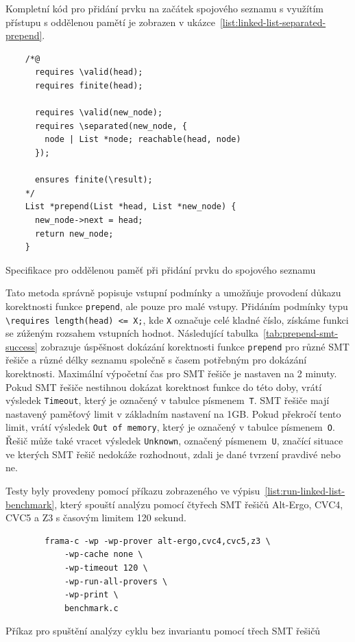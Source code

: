 Kompletní kód pro přidání prvku na začátek spojového seznamu
s využítím přístupu s oddělenou pamětí je zobrazen v ukázce~\ref{list:linked-list-separated-prepend}.

\begin{listing}[H]
    \begin{verbatim}
    /*@
      requires \valid(head);
      requires finite(head);

      requires \valid(new_node);
      requires \separated(new_node, {
        node | List *node; reachable(head, node)
      });

      ensures finite(\result);
    */
    List *prepend(List *head, List *new_node) {
      new_node->next = head;
      return new_node;
    }
    \end{verbatim}
    \caption{Specifikace pro oddělenou paměť při přidání prvku do spojového seznamu}
    \label{list:linked-list-separated-prepend}
\end{listing}

Tato metoda správně popisuje vstupní podmínky a umožňuje provodení důkazu korektnosti funkce \texttt{prepend},
ale pouze pro malé vstupy.
Přidáním podmínky typu \texttt{\textbackslash requires length(head) <= X;},
kde \texttt{X} označuje celé kladné číslo,
získáme funkci se zúženým rozsahem vstupních hodnot.
Následující tabulka~\ref{tab:prepend-smt-success} zobrazuje úspěšnost dokázání korektnosti funkce \texttt{prepend}
pro různé SMT řešiče a různé délky seznamu společně s časem potřebným pro dokázání korektnosti.
Maximální výpočetní čas pro SMT řešiče je nastaven na 2 minuty.
Pokud SMT řešiče nestihnou dokázat korektnost funkce do této doby,
vrátí výsledek \texttt{Timeout}, který je označený v tabulce písmenem~\texttt{T}.
SMT řešiče mají nastavený paměťový limit v základním nastavení na 1GB\@.
Pokud překročí tento limit, vrátí výsledek \texttt{Out of memory},
který je označený v tabulce písmenem~\texttt{O}.
Řešič může také vracet výsledek \texttt{Unknown}, označený písmenem~\texttt{U},
značící situace ve kterých SMT řešič nedokáže rozhodnout,
zdali je dané tvrzení pravdivé nebo ne.


Testy byly provedeny pomocí příkazu zobrazeného ve výpisu~\ref{list:run-linked-list-benchmark},
který spouští analýzu pomocí čtyřech SMT řešičů Alt-Ergo, CVC4, CVC5 a Z3 s časovým limitem 120 sekund.

\begin{listing}[H]
    \begin{verbatim}
        frama-c -wp -wp-prover alt-ergo,cvc4,cvc5,z3 \
            -wp-cache none \
            -wp-timeout 120 \
            -wp-run-all-provers \
            -wp-print \
            benchmark.c
    \end{verbatim}
    \caption{Příkaz pro spuštění analýzy cyklu bez invariantu pomocí třech SMT řešičů}
    \label{list:run-linked-list-benchmark}
\end{listing}

